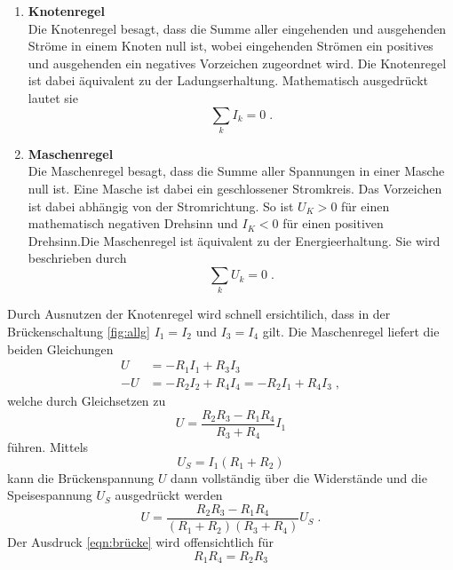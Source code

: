 \begin{enumerate}
    \item\textbf{Knotenregel}
    \\\noindent
    Die Knotenregel besagt, dass die Summe aller eingehenden und ausgehenden Ströme in einem Knoten null ist, wobei eingehenden Strömen 
    ein positives und ausgehenden ein negatives Vorzeichen zugeordnet wird. Die Knotenregel ist dabei äquivalent zu der Ladungserhaltung.
    Mathematisch ausgedrückt lautet sie
    \begin{equation}
        \sum_k I_k=0 \;.
        \label{eqn:kirchhoff1}
    \end{equation}

    \item\textbf{Maschenregel}
    \\\noindent
    Die Maschenregel besagt, dass die Summe aller Spannungen in einer Masche null ist. Eine Masche ist dabei ein geschlossener Stromkreis. 
    Das Vorzeichen ist dabei abhängig von der Stromrichtung. So ist $U_K>0$ für einen mathematisch negativen Drehsinn und $I_K<0$ für einen
    positiven Drehsinn.Die Maschenregel ist äquivalent zu der Energieerhaltung. Sie wird beschrieben durch
    \begin{equation}
        \sum_k U_k=0 \;.
        \label{eqn:kirchhoff2}
    \end{equation}
\end{enumerate}
Durch Ausnutzen der Knotenregel wird schnell ersichtilich, dass in der Brückenschaltung \ref{fig:allg} $I_1=I_2$ und $I_3=I_4$ gilt. 
Die Maschenregel liefert die beiden Gleichungen 
\begin{align*}
    U &=-R_1I_1 + R_3I_3\\
    -U&=-R_2I_2 + R_4I_4 = -R_2I_1+R_4I_3 \;,
\end{align*}
welche durch Gleichsetzen zu 
\begin{equation*}
    U=\frac{R_2R_3-R_1R_4}{R_3+R_4}I_1
\end{equation*}
führen. Mittels 
\begin{equation*}
    U_S=I_1(R_1+R_2)
\end{equation*}
kann die Brückenspannung $U$ dann vollständig über die Widerstände und die Speisespannung $U_S$ ausgedrückt werden 
\begin{equation}
    U=\frac{R_2R_3-R_1R_4}{(R_1+R_2)(R_3+R_4)}U_S\;.
    \label{eqn:brücke}
\end{equation}
Der Ausdruck \eqref{eqn:brücke} wird offensichtlich für 
\begin{equation}
    R_1R_4=R_2R_3
    \label{eqn:abgleich} 
\end{equation}
